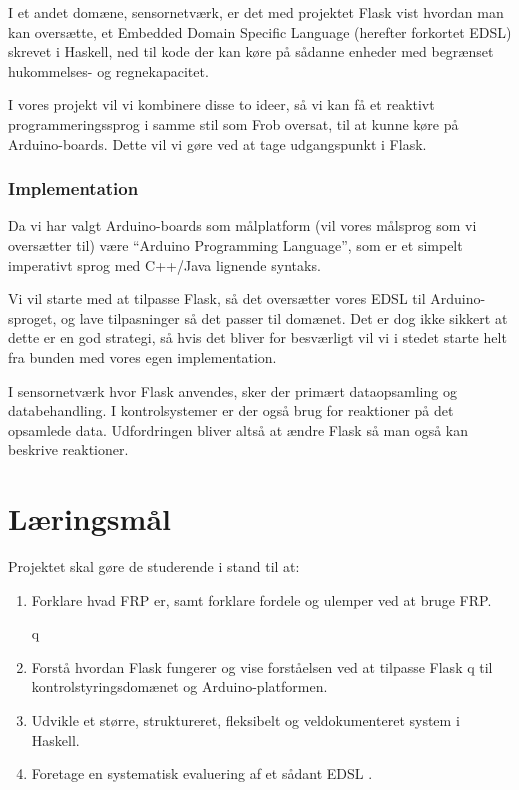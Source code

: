 \documentclass[a4paper,oneside, draft]{memoir}
\newcommand{\EDSL}{Embedded Domain Specific Language (herefter forkortet
  EDSL) \renewcommand{\EDSL}{ EDSL }}
\begin{document}
I et andet domæne, sensornetværk, er det med projektet Flask\cite{flask08} vist
hvordan man kan oversætte, et \EDSL skrevet i Haskell, ned til kode der
kan køre på sådanne enheder med begrænset hukommelses- og
regnekapacitet. 

I vores projekt vil vi kombinere disse to ideer, så vi kan få et reaktivt
programmeringssprog i samme stil som Frob oversat, til at kunne køre på
Arduino-boards. Dette vil vi gøre ved at tage udgangspunkt i Flask.  


\subsubsection{Implementation}
Da vi har valgt Arduino-boards som målplatform (vil vores målsprog
som vi oversætter til) være "`Arduino Programming Language"', som er et
simpelt imperativt sprog med C++/Java lignende syntaks.

Vi vil starte med at tilpasse Flask, så det oversætter vores \EDSL til
Arduino-sproget, og lave tilpasninger så det passer til domænet. Det
er dog ikke sikkert at dette er en god strategi, så hvis det bliver for
besværligt vil vi i stedet starte helt fra bunden med vores egen
implementation.

I sensornetværk hvor Flask anvendes, sker der primært dataopsamling og
databehandling. I kontrolsystemer er der også brug for reaktioner på
det opsamlede data. Udfordringen bliver altså at ændre Flask så man
også kan beskrive reaktioner.

\section{Læringsmål}

Projektet skal gøre de studerende i stand til at:

\begin{enumerate}

\item Forklare hvad FRP er, samt forklare fordele og ulemper ved at bruge FRP.
  
q\item Forstå hvordan Flask fungerer og vise forståelsen ved at tilpasse Flask
 q til kontrolstyringsdomænet og Arduino-platformen.
  
\item Udvikle et større, struktureret, fleksibelt og veldokumenteret system i
  Haskell.
  
\item Foretage en systematisk evaluering af et sådant \EDSL.
  
\end{enumerate}
\end{document}
